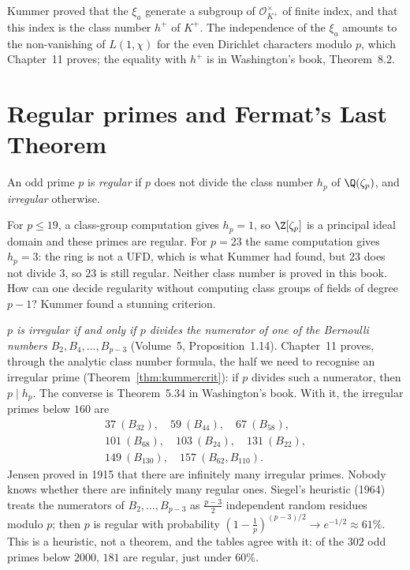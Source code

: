 \begin{remark}
Kummer proved that the $\xi_a$ generate a subgroup of $\mathcal O_{K^+}^\times$ of finite index, and that this index is the
class number $h^+$ of $K^+$. The independence of the $\xi_a$ amounts to the non-vanishing of $L(1,\chi)$ for the even
Dirichlet characters modulo $p$, which Chapter~11 proves; the equality with $h^+$ is in Washington's book, Theorem~8.2.
\end{remark}

\section{Regular primes and Fermat's Last Theorem}

\begin{definition}
An odd prime $p$ is \emph{regular} if $p$ does not divide the class number $h_p$ of $\Q(\zeta_p)$, and \emph{irregular}
otherwise.
\end{definition}

For $p\le19$, a class-group computation gives $h_p=1$, so $\Z[\zeta_p]$ is a principal ideal domain and these primes are
regular. For $p=23$ the same computation gives $h_p=3$: the ring is not a UFD, which is what Kummer had found, but
$23$ does not divide $3$, so $23$ is still regular. Neither class number is proved in this book. How can one decide
regularity without computing class groups of fields of degree $p-1$? Kummer found a stunning criterion.

\begin{remark}
\emph{$p$ is irregular if and only if $p$ divides the numerator of one of the Bernoulli numbers $B_2,B_4,\dots,B_{p-3}$}
(Volume~5, Proposition~1.14). Chapter~11 proves, through the analytic class number formula, the half we need to recognise an
irregular prime (Theorem~\ref{thm:kummercrit}): if $p$ divides such a numerator, then $p\mid h_p$. The converse is Theorem~5.34 in Washington's book. With it,
the irregular primes below $160$ are
\begin{gather*}
37\ (B_{32}),\quad 59\ (B_{44}),\quad 67\ (B_{58}),\\ 101\ (B_{68}),\quad 103\ (B_{24}),\quad 131\ (B_{22}),\\
149\ (B_{130}),\quad 157\ (B_{62},B_{110}).
\end{gather*}
Jensen proved in 1915 that there are infinitely many irregular primes. Nobody knows whether there are infinitely many regular
ones. Siegel's heuristic (1964) treats the numerators of $B_2,\dots,B_{p-3}$ as $\frac{p-3}2$ independent random residues
modulo $p$; then $p$ is regular with probability $(1-\frac1p)^{(p-3)/2}\to e^{-1/2}\approx61\%$. This is a heuristic, not a
theorem, and the tables agree with it: of the $302$ odd primes below $2000$, $181$ are regular, just under $60\%$.
\end{remark}

